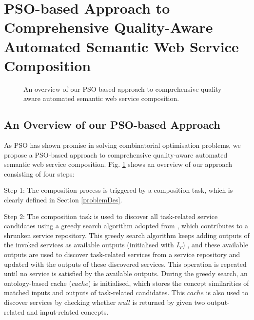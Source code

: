\documentclass{llncs}
\begin{document}
\section{PSO-based Approach to Comprehensive Quality-Aware Automated Semantic Web Service Composition}\label{qswsc_approach}
\vspace{-0.8cm}
\begin{figure}[h]
\centering
{}
 \caption{An overview of our PSO-based approach to comprehensive quality-aware automated semantic web service composition.}
 \label{overview}
\end{figure}
\vspace{-1.0cm}
\subsection{An Overview of our PSO-based Approach}\label{PSO_based_approach}

As PSO has shown promise in solving combinatorial optimisation problems, we propose a PSO-based approach to comprehensive quality-aware automated semantic web service composition. Fig. \ref{overview} shows an overview of our approach consisting of four steps: 

Step 1: The composition process is triggered by a composition task, which is clearly defined in Section \ref{problemDes}. 

Step 2: The composition task is used to discover all task-related service candidates using a greedy search algorithm adopted from \cite{ma2015hybrid}, which contributes to a shrunken service repository. This greedy search algorithm keeps adding outputs of the invoked services as available outputs (initialised with $I_{T}$) , and these available outputs are used to discover task-related services from a service repository and updated with the outputs of these discovered services. This operation is repeated until no service is satisfied by the available outputs. During the greedy search, an ontology-based cache ($cache$) is initialised, which stores the concept similarities of matched inputs and outputs of task-related candidates. This $cache$ is also used to discover services by checking whether $null$ is returned by given two output-related and input-related concepts.
\end{document}
